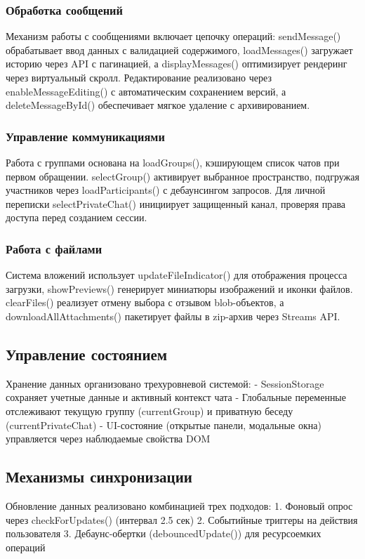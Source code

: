 \subsubsection{Обработка сообщений}
Механизм работы с сообщениями включает цепочку операций: sendMessage() обрабатывает ввод данных с валидацией содержимого, loadMessages() загружает историю через API с пагинацией, а displayMessages() оптимизирует рендеринг через виртуальный скролл. Редактирование реализовано через enableMessageEditing() с автоматическим сохранением версий, а deleteMessageById() обеспечивает мягкое удаление с архивированием.

\subsubsection{Управление коммуникациями}
	Работа с группами основана на loadGroups(), кэширующем список чатов при первом обращении. selectGroup() активирует выбранное пространство, подгружая участников через loadParticipants() с дебаунсингом запросов. Для личной переписки selectPrivateChat() инициирует защищенный канал, проверяя права доступа перед созданием сессии.
	
	\subsubsection{Работа с файлами}
		Система вложений использует updateFileIndicator() для отображения процесса загрузки, showPreviews() генерирует миниатюры изображений и иконки файлов. clearFiles() реализует отмену выбора с отзывом blob-объектов, а downloadAllAttachments() пакетирует файлы в zip-архив через Streams API.
		
		\subsection{Управление состоянием}
		Хранение данных организовано трехуровневой системой: 
		- SessionStorage сохраняет учетные данные и активный контекст чата 
		- Глобальные переменные отслеживают текущую группу (currentGroup) и приватную беседу (currentPrivateChat)
		- UI-состояние (открытые панели, модальные окна) управляется через наблюдаемые свойства DOM
		
		\subsection{Механизмы синхронизации}
		Обновление данных реализовано комбинацией трех подходов: 
		1. Фоновый опрос через checkForUpdates() (интервал 2.5 сек)
		2. Событийные триггеры на действия пользователя 
		3. Дебаунс-обертки (debouncedUpdate()) для ресурсоемких операций
		

